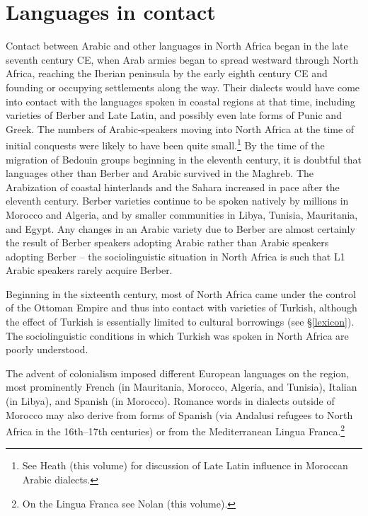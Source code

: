 \documentclass[output=paper]{langsci/langscibook}
\begin{document}
\section{ Languages in contact}

Contact between Arabic and other languages in North Africa began in the late seventh century CE, when Arab armies began to spread westward through North Africa, reaching the Iberian peninsula by the early eighth century CE and founding or occupying settlements along the way. Their dialects would have come into contact with the languages spoken in coastal regions at that time, including varieties of Berber and Late Latin, and possibly even late forms of Punic and Greek. The numbers of Arabic-speakers moving into North Africa at the time of initial conquests were likely to have been quite small.\footnote{See Heath (this volume) for discussion of Late Latin influence in Moroccan Arabic dialects.} By the time of the migration of Bedouin groups beginning in the eleventh century, it is doubtful that languages other than Berber and Arabic survived in the Maghreb. The Arabization of coastal hinterlands and the Sahara increased in pace after the eleventh century. Berber varieties continue to be spoken natively by millions in Morocco and Algeria, and by smaller communities in Libya, Tunisia, Mauritania, and Egypt. Any changes in an Arabic variety due to Berber are almost certainly the result of Berber speakers adopting Arabic rather than Arabic speakers adopting Berber -- the sociolinguistic situation in North Africa is such that L1 Arabic speakers rarely acquire Berber.

  Beginning in the sixteenth century, most of North Africa came under the control of the Ottoman Empire and thus into contact with varieties of Turkish, although the effect of Turkish is essentially limited to cultural borrowings (see §\ref{lexicon}). The sociolinguistic conditions in which Turkish was spoken in North Africa are poorly understood.

  The advent of colonialism imposed different European languages on the region, most prominently French (in Mauritania, Morocco, Algeria, and Tunisia), Italian (in Libya), and Spanish (in Morocco). Romance words in dialects outside of Morocco may also derive from forms of Spanish (via Andalusi refugees to North Africa in the 16th--17th centuries) or from the Mediterranean Lingua Franca.\footnote{On the Lingua Franca see Nolan (this volume).}
\end{document}
